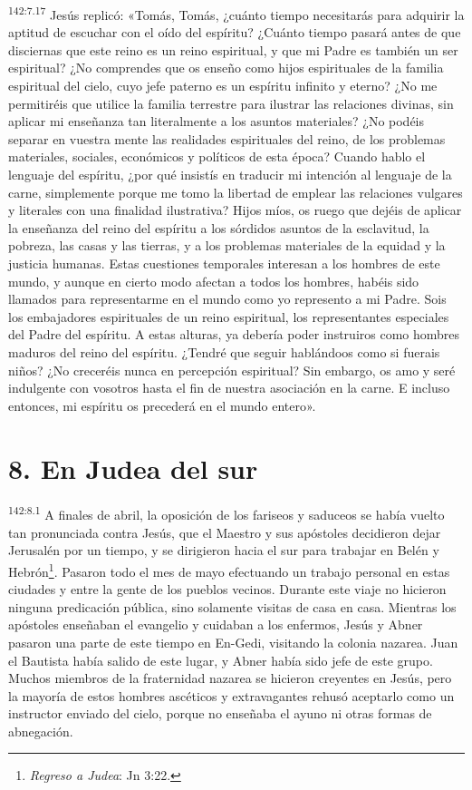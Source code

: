 \par 
\textsuperscript{142:7.17} Jesús replicó: «Tomás, Tomás, ¿cuánto tiempo necesitarás para adquirir la aptitud de escuchar con el oído del espíritu? ¿Cuánto tiempo pasará antes de que disciernas que este reino es un reino espiritual, y que mi Padre es también un ser espiritual? ¿No comprendes que os enseño como hijos espirituales de la familia espiritual del cielo, cuyo jefe paterno es un espíritu infinito y eterno? ¿No me permitiréis que utilice la familia terrestre para ilustrar las relaciones divinas, sin aplicar mi enseñanza tan literalmente a los asuntos materiales? ¿No podéis separar en vuestra mente las realidades espirituales del reino, de los problemas materiales, sociales, económicos y políticos de esta época? Cuando hablo el lenguaje del espíritu, ¿por qué insistís en traducir mi intención al lenguaje de la carne, simplemente porque me tomo la libertad de emplear las relaciones vulgares y literales con una finalidad ilustrativa? Hijos míos, os ruego que dejéis de aplicar la enseñanza del reino del espíritu a los sórdidos asuntos de la esclavitud, la pobreza, las casas y las tierras, y a los problemas materiales de la equidad y la justicia humanas. Estas cuestiones temporales interesan a los hombres de este mundo, y aunque en cierto modo afectan a todos los hombres, habéis sido llamados para representarme en el mundo como yo represento a mi Padre. Sois los embajadores espirituales de un reino espiritual, los representantes especiales del Padre del espíritu. A estas alturas, ya debería poder instruiros como hombres maduros del reino del espíritu. ¿Tendré que seguir hablándoos como si fuerais niños? ¿No creceréis nunca en percepción espiritual? Sin embargo, os amo y seré indulgente con vosotros hasta el fin de nuestra asociación en la carne. E incluso entonces, mi espíritu os precederá en el mundo entero».

\section*{8. En Judea del sur}
\par 
\textsuperscript{142:8.1} A finales de abril, la oposición de los fariseos y saduceos se había vuelto tan pronunciada contra Jesús, que el Maestro y sus apóstoles decidieron dejar Jerusalén por un tiempo, y se dirigieron hacia el sur para trabajar en Belén y Hebrón\footnote{\textit{Regreso a Judea}: Jn 3:22.}. Pasaron todo el mes de mayo efectuando un trabajo personal en estas ciudades y entre la gente de los pueblos vecinos. Durante este viaje no hicieron ninguna predicación pública, sino solamente visitas de casa en casa. Mientras los apóstoles enseñaban el evangelio y cuidaban a los enfermos, Jesús y Abner pasaron una parte de este tiempo en En-Gedi, visitando la colonia nazarea. Juan el Bautista había salido de este lugar, y Abner había sido jefe de este grupo. Muchos miembros de la fraternidad nazarea se hicieron creyentes en Jesús, pero la mayoría de estos hombres ascéticos y extravagantes rehusó aceptarlo como un instructor enviado del cielo, porque no enseñaba el ayuno ni otras formas de abnegación.

